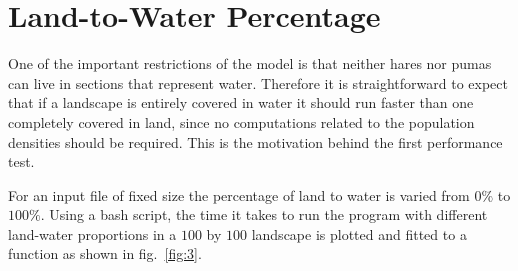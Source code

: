 \documentclass[12pt,a4paper]{article}
\begin{document}
\section{Land-to-Water Percentage}

One of the important restrictions of the model is that neither hares nor 
pumas can live in sections that represent water. Therefore it is 
straightforward to expect 
that if a landscape is entirely covered in water it should run faster than one 
completely covered 
in land, since no computations related to the population densities should be 
required. This is the motivation behind the first performance test.

For an input file of fixed size the percentage of land to water is varied from 
$0\%$ to $100\%$. Using a bash script, the time it takes to run the program 
with different land-water proportions in a $100$ by $100$ landscape is plotted 
and fitted to a function as shown in fig.~\ref{fig:3}.
\end{document}
